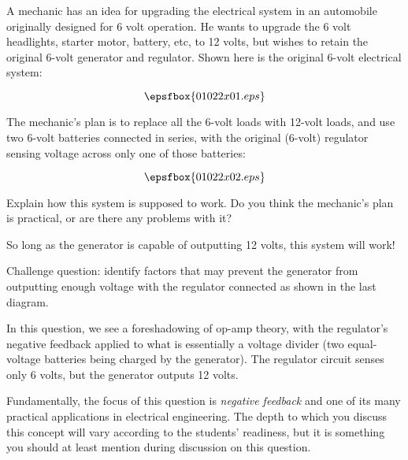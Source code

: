 

A mechanic has an idea for upgrading the electrical system in an automobile originally designed for 6 volt operation.  He wants to upgrade the 6 volt headlights, starter motor, battery, etc, to 12 volts, but wishes to retain the original 6-volt generator and regulator.  Shown here is the original 6-volt electrical system:

$$\epsfbox{01022x01.eps}$$

The mechanic's plan is to replace all the 6-volt loads with 12-volt loads, and use two 6-volt batteries connected in series, with the original (6-volt) regulator sensing voltage across only one of those batteries:

$$\epsfbox{01022x02.eps}$$

Explain how this system is supposed to work.  Do you think the mechanic's plan is practical, or are there any problems with it?







So long as the generator is capable of outputting 12 volts, this system will work!

\vskip 10pt

Challenge question: identify factors that may prevent the generator from outputting enough voltage with the regulator connected as shown in the last diagram.







In this question, we see a foreshadowing of op-amp theory, with the regulator's negative feedback applied to what is essentially a voltage divider (two equal-voltage batteries being charged by the generator).  The regulator circuit senses only 6 volts, but the generator outputs 12 volts.

Fundamentally, the focus of this question is {\it negative feedback} and one of its many practical applications in electrical engineering.  The depth to which you discuss this concept will vary according to the students' readiness, but it is something you should at least mention during discussion on this question.

